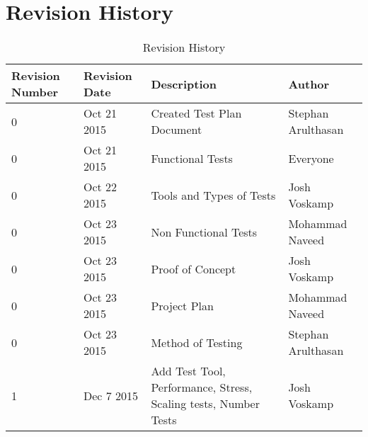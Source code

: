 \documentclass[12pt]{article}
\begin{document}
\begin{titlepage}



\vfill %

\end{titlepage}

\newpage
\tableofcontents
\newpage
\listoftables
{}
\newpage
\listoffigures
{}
\newpage

\section*{Revision History}
\begin{table}[H]
	\centering
    \begin{tabular}{ | p{2cm} |  p{2cm} | p{5cm} | p{3.8cm} |}\hline
    Revision Number & Revision Date & Description & Author \\ \hline
    0 & Oct 21 2015 & Created Test Plan Document & Stephan Arulthasan \\ \hline
    0 & Oct 21 2015 & Functional Tests & Everyone \\ \hline
    0 & Oct 22 2015 & Tools and Types of Tests & Josh Voskamp \\ \hline
    0 & Oct 23 2015 & Non Functional Tests & Mohammad Naveed \\ \hline
    0 & Oct 23 2015 & Proof of Concept & Josh Voskamp \\ \hline
    0 & Oct 23 2015 & Project Plan & Mohammad Naveed \\ \hline
    0 & Oct 23 2015 & Method of Testing & Stephan Arulthasan \\ \hline
	\color{red} 1 &\color{red} Dec 7 2015 &\color{red} Add Test Tool, Performance, Stress, Scaling tests, Number Tests &\color{red} Josh Voskamp \\\hline
    \end{tabular}
    \caption{Revision History}
\end{table}
\end{document}
